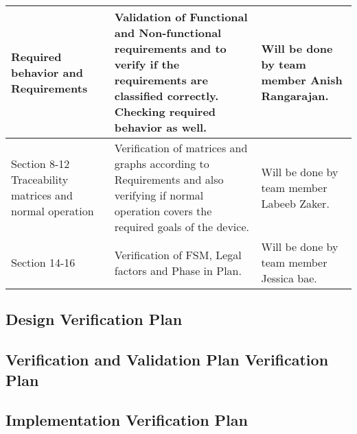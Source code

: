 \documentclass[12pt, titlepage]{article}
\begin{document}
\begin{center}
\begin{tabular}{|m{3cm}|m{8cm}|m{4cm}|}
  \hline
  Required behavior and Requirements       & Validation of Functional and Non-functional requirements and to verify if the requirements are classified correctly. Checking required behavior as well.       & Will be done by team member Anish Rangarajan.                                                                                         \\
  \hline
  Section 8-12 Traceability matrices and normal operation      & Verification of matrices and graphs according to Requirements and also verifying if normal operation covers the required goals of the device. & Will be done by team member Labeeb Zaker.\\
  \hline
  Section 14-16        & Verification of FSM, Legal factors and Phase in Plan.       & Will be done by team member Jessica bae.                                                          \\
  \hline
\end{tabular}
  \end{center}
\subsection{Design Verification Plan}




\subsection{Verification and Validation Plan Verification Plan}




\subsection{Implementation Verification Plan}
\end{document}
